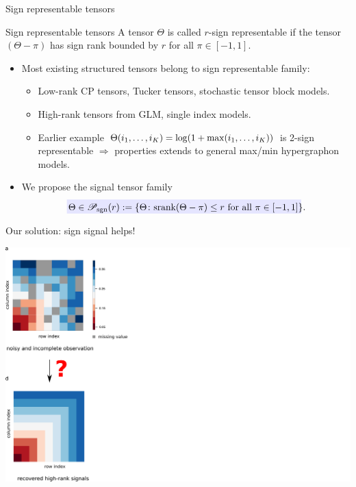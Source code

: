 \documentclass[10pt, mathserif]{beamer} %
\theoremstyle{definition}
\theoremstyle{plain}
\def\caliP{\mathscr{P}_{\textup{sgn}}}
\def\caliP{\mathscr{P}_{\textup{sgn}}}
\begin{document}
\begin{frame}{Sign representable tensors}
    \begin{block}{Sign representable tensors} 
A tensor $\Theta$ is called {\color{red}$r$-sign representable} if the tensor $(\Theta-\pi)$ has sign rank bounded by $r$ for all $\pi\in[-1,1].$ 
    \end{block}
    \begin{itemize}
   \item Most existing structured tensors belong to sign representable family:
    \begin{itemize}
      \item {\color{red}Low-rank} CP tensors, Tucker tensors, stochastic tensor block models.
       \item {\color{red}High-rank} tensors from GLM, single index models. 
        \item Earlier example $\small \Theta(i_1,\ldots,i_K) = \log(1+\max(i_1,\ldots,i_K))$ is 2-sign representable $\Rightarrow$ properties extends to general max/min hypergraphon models. 
    \end{itemize} 
    
       \item We propose the signal tensor family
       \begin{align}
         \rlap{\textcolor{blue!10}{\rule[-\dp\strutbox]{250pt}{\baselineskip}}}\,  \Theta\in\caliP(r):=\{\Theta\colon\text{srank}(\Theta-\pi)\leq r \text{ for all } \pi\in[-1,1]\}.
       \end{align}
      \end{itemize}
\end{frame}


\begin{frame}{Our solution: sign signal helps!}
 
     \begin{center}
     \includegraphics[width =\textwidth]{Figures/mainidea_step1.pdf}
        \end{center}
   \end{frame}
\end{document}

